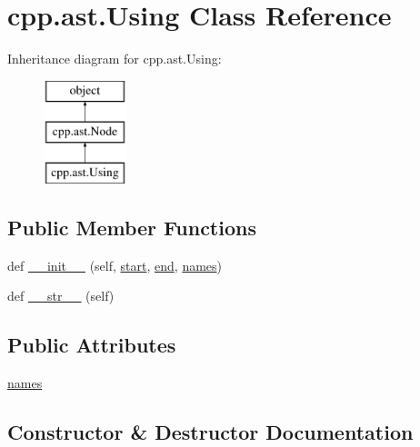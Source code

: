\hypertarget{classcpp_1_1ast_1_1Using}{}\section{cpp.\+ast.\+Using Class Reference}
\label{classcpp_1_1ast_1_1Using}
Inheritance diagram for cpp.\+ast.\+Using\+:\begin{figure}[H]
\begin{center}
\leavevmode
\includegraphics[height=3.000000cm]{classcpp_1_1ast_1_1Using}
\end{center}
\end{figure}
\subsection*{Public Member Functions}
\begin{DoxyCompactItemize}
\item 
def \mbox{\hyperlink{classcpp_1_1ast_1_1Using_a9b7a760a06d00f7211c889d9841e06af}{\+\_\+\+\_\+init\+\_\+\+\_\+}} (self, \mbox{\hyperlink{classcpp_1_1ast_1_1Node_a7b2aa97e6a049bb1a93aea48c48f1f44}{start}}, \mbox{\hyperlink{classcpp_1_1ast_1_1Node_a3c5e5246ccf619df28eca02e29d69647}{end}}, \mbox{\hyperlink{classcpp_1_1ast_1_1Using_abc05dedb59eb83857d373cc0e64eccb3}{names}})
\item 
def \mbox{\hyperlink{classcpp_1_1ast_1_1Using_ac209e8e5d84988d14a8f4b30377e5455}{\+\_\+\+\_\+str\+\_\+\+\_\+}} (self)
\end{DoxyCompactItemize}
\subsection*{Public Attributes}
\begin{DoxyCompactItemize}
\item 
\mbox{\hyperlink{classcpp_1_1ast_1_1Using_abc05dedb59eb83857d373cc0e64eccb3}{names}}
\end{DoxyCompactItemize}


\subsection{Constructor \& Destructor Documentation}
\mbox{\label{classcpp_1_1ast_1_1Using_a9b7a760a06d00f7211c889d9841e06af}} 
